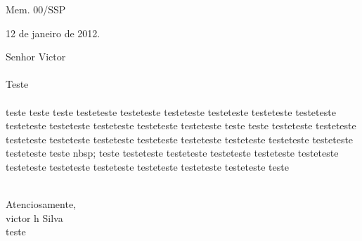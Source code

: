 \documentclass[12pt,a4paper]{report}
\begin{document}
	Mem. 00/SSP \\
	\begin{flushright} 12 de janeiro de 2012.\end{flushright}
	Senhor Victor\\ \\
	Teste\\ \\
	teste teste teste testeteste testeteste testeteste testeteste testeteste testeteste testeteste testeteste testeteste testeteste testeteste teste
teste testeteste testeteste testeteste testeteste testeteste testeteste testeteste testeteste testeteste testeteste testeteste teste
nbsp;
teste testeteste testeteste testeteste testeteste testeteste testeteste testeteste testeteste testeteste testeteste testeteste teste\\ \\
	\begin{center}
		Atenciosamente,\\
		victor h  Silva\\
		teste\\
	\end{center}
\end{document}
